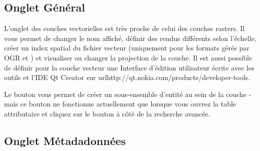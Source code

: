 \subsection{Onglet Général}\label{vectorgeneraltab}
L'onglet  des couches vectorielles est très proche de celui des 
couches rasters. Il vous permet de changer le nom affiché, définir des rendus 
différents selon l'échelle, créer un index spatial du fichier vecteur (uniquement 
pour les formats gérés par OGR et \pg) et visualiser ou changer la projection de 
la couche. Il est aussi possible de définir pour la couche vecteur une Interface 
d'édition utilisateur écrite avec les outils et l'IDE Qt Creator sur 
url{http://qt.nokia.com/products/developer-tools}. 

Le bouton  vous permet de créer un sous-ensemble 
d'entité au sein de la couche - mais ce bouton ne fonctionne actuellement que 
lorsque vous ouvrez la table attributaire et cliquez sur le bouton \button{\dots} 
à côté de la recherche avancée.

\subsection{Onglet Métadadonnées}

